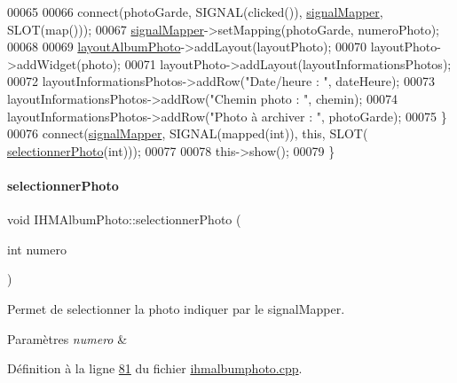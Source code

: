 \begin{DoxyCode}
00065 
00066         connect(photoGarde, SIGNAL(clicked()), \hyperlink{class_i_h_m_album_photo_a184d7d26edab19328980b55ce727811b}{signalMapper}, SLOT(map()));
00067         \hyperlink{class_i_h_m_album_photo_a184d7d26edab19328980b55ce727811b}{signalMapper}->setMapping(photoGarde, numeroPhoto);
00068 
00069         \hyperlink{class_i_h_m_album_photo_a1b4028248430efc384e34b0151709fa0}{layoutAlbumPhoto}->addLayout(layoutPhoto);
00070         layoutPhoto->addWidget(photo);
00071         layoutPhoto->addLayout(layoutInformationsPhotos);
00072         layoutInformationsPhotos->addRow(\textcolor{stringliteral}{"Date/heure : "}, dateHeure);
00073         layoutInformationsPhotos->addRow(\textcolor{stringliteral}{"Chemin photo : "}, chemin);
00074         layoutInformationsPhotos->addRow(\textcolor{stringliteral}{"Photo à archiver : "}, photoGarde);
00075     \}
00076     connect(\hyperlink{class_i_h_m_album_photo_a184d7d26edab19328980b55ce727811b}{signalMapper}, SIGNAL(mapped(\textcolor{keywordtype}{int})), \textcolor{keyword}{this}, SLOT(
      \hyperlink{class_i_h_m_album_photo_ad0760043151686deea04f8282e6d2210}{selectionnerPhoto}(\textcolor{keywordtype}{int})));
00077 
00078     this->show();
00079 \}
\end{DoxyCode}
\mbox{\label{class_i_h_m_album_photo_ad0760043151686deea04f8282e6d2210}} 
\paragraph{\texorpdfstring{selectionner\+Photo}{selectionnerPhoto}}
{\footnotesize\ttfamily void I\+H\+M\+Album\+Photo\+::selectionner\+Photo (\begin{DoxyParamCaption}\item[{int}]{numero }\end{DoxyParamCaption})\hspace{0.3cm}{\ttfamily [slot]}}



Permet de selectionner la photo indiquer par le signal\+Mapper. 


\begin{DoxyParams}{Paramètres}
{\em numero} & \\
\hline
\end{DoxyParams}


Définition à la ligne \hyperlink{ihmalbumphoto_8cpp_source_l00081}{81} du fichier \hyperlink{ihmalbumphoto_8cpp_source}{ihmalbumphoto.\+cpp}.



